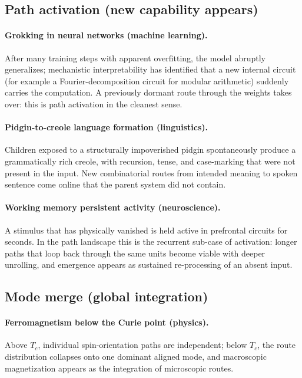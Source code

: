 \documentclass[11pt,a4paper]{article}
\begin{document}
\subsection{Path activation (new capability appears)}

\paragraph{Grokking in neural networks (machine learning).}
After many training steps with apparent overfitting, the model
abruptly generalizes; mechanistic interpretability has identified
that a new internal circuit (for example a Fourier-decomposition
circuit for modular arithmetic) suddenly carries the computation.
A previously dormant route through the weights takes over: this is
path activation in the cleanest sense.

\paragraph{Pidgin-to-creole language formation (linguistics).}
Children exposed to a structurally impoverished pidgin
spontaneously produce a grammatically rich creole, with recursion,
tense, and case-marking that were not present in the input. New
combinatorial routes from intended meaning to spoken sentence
come online that the parent system did not contain.

\paragraph{Working memory persistent activity (neuroscience).}
A stimulus that has physically vanished is held active in
prefrontal circuits for seconds. In the path landscape this is the
recurrent sub-case of activation: longer paths that loop back
through the same units become viable with deeper unrolling, and
emergence appears as sustained re-processing of an absent input.

\subsection{Mode merge (global integration)}

\paragraph{Ferromagnetism below the Curie point (physics).}
Above $T_c$, individual spin-orientation paths are independent;
below $T_c$, the route distribution collapses onto one dominant
aligned mode, and macroscopic magnetization appears as the
integration of microscopic routes.
\end{document}
